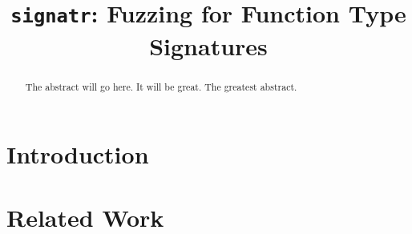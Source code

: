 \documentclass[sigconf,review, anonymous]{acmart}
\begin{document}
\title{{\tt signatr}: Fuzzing for Function Type Signatures}

\begin{abstract}
The abstract will go here.
It will be great.
The greatest abstract.
\end{abstract}

\maketitle

\section{Introduction}

\section{Related Work}



\end{document}
